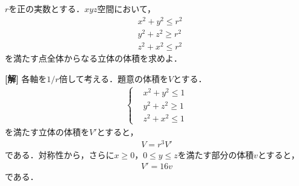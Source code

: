 \documentclass[a4j]{jarticle}
\begin{document}

     \begin{oframed}
     $r$を正の実数とする．$xyz$空間において，
          \begin{align*}
          &x^2+y^2\le r^2 \\
          &y^2+z^2\ge r^2 \\
          &z^2+x^2\le r^2 
          \end{align*}
     を満たす点全体からなる立体の体積を求めよ．
     \end{oframed}

\setlength{\columnseprule}{0.4pt}
\begin{multicols}{2}
{\bf[解]} 各軸を$1/r$倍して考える．題意の体積を$V$とする．
          \begin{align*}
               \begin{cases}
               &x^2+y^2\le1 \\
               &y^2+z^2\ge1 \\
               &z^2+x^2\le1 
               \end{cases}
          \end{align*}
を満たす立体の体積を$V'$とすると，
     \begin{align}
     V=r^3V'\label{1}
     \end{align}
である．対称性から，さらに$x\ge0$，$0\le y\le z$を満たす部分の体積$v$とすると，     
     \begin{align}
     V'=16v\label{2}
     \end{align}
である．


\end{multicols}
\end{document}
